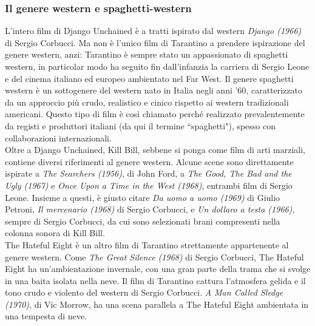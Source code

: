 \documentclass[12pt]{article} %
\begin{document}
\subsubsection*{Il genere western e spaghetti-western}
\begin{flushleft}
    L'intero film di Django Unchained è a tratti ispirato dal western \textit{Django (1966)} di Sergio Corbucci. Ma non è l'unico film di Tarantino a prendere ispirazione del genere western, anzi: Tarantino è sempre stato un appassionato di spaghetti western, in particolar modo ha seguito fin dall'infanzia la carriera di Sergio Leone e del cinema italiano ed europeo ambientato nel Far West.
    Il genere spaghetti western è un sottogenere del western nato in Italia negli anni '60, caratterizzato da un approccio più crudo, realistico e cinico rispetto ai western tradizionali americani. Questo tipo di film è così chiamato perché realizzato prevalentemente da registi e produttori italiani (da qui il termine ``spaghetti"), spesso con collaborazioni internazionali.
    \\\vspace{1cm}Oltre a Django Unchained, Kill Bill, sebbene si ponga come film di arti marziali, contiene diversi riferimenti al genere western. Alcune scene sono direttamente ispirate a \textit{The Searchers (1956)}, di John Ford, a \textit{The Good, The Bad and the Ugly (1967)} e \textit{Once Upon a Time in the West (1968)}, entrambi film di Sergio Leone. Insieme a questi, è giusto citare \textit{Da uomo a uomo (1969)} di Giulio Petroni, \textit{Il mercenario (1968)} di Sergio Corbucci, e \textit{Un dollaro a testa (1966)}, sempre di Sergio Corbucci, da cui sono selezionati brani compresenti nella colonna sonora di Kill Bill.
    \\\vspace{1cm} The Hateful Eight è un altro film di Tarantino strettamente appartenente al genere western. Come \textit{The Great Silence (1968)} di Sergio Corbucci, The Hateful Eight ha un'ambientazione invernale, con una gran parte della trama che si svolge in una baita isolata nella neve. Il film di Tarantino cattura l'atmosfera gelida e il tono crudo e violento del western di Sergio Corbucci. \textit{A Man Called Sledge (1970)}, di Vic Morrow, ha una scena parallela a The Hateful Eight ambientata in una tempesta di neve.
\end{flushleft}
\end{document}
